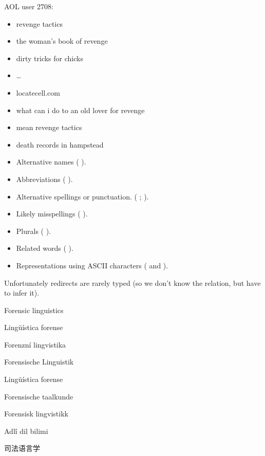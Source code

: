 \documentclass[a4paper,landscape,headrule,footrule,xetex]{foils}
\begin{document}
AOL user 2708:
\begin{itemize}\addtolength{\itemsep}{-1ex}
\item revenge tactics
\item the woman's book of revenge
\item dirty tricks for chicks
\item \ldots
\item locatecell.com
\item what can i do to an old lover for revenge
\item mean revenge tactics
\item death records in hampstead
\end{itemize}


\begin{itemize}\addtolength{\itemsep}{-1ex}
\item  Alternative names ( \into {}).
\item Abbreviations ( \into {}).
\item Alternative spellings or punctuation. ( \into {};  \into {}).
\item Likely misspellings ( \into {}).
\item Plurals ( \into {}).
\item Related words ( \into {}).
\item Representations using ASCII characters ( and  \into  {}). 
 \end{itemize}

Unfortunately redirects are rarely typed (so we don't know the
relation, but have to infer it).
 
\MyLogo{}
\begin{description}\addtolength{\itemsep}{-1ex}
\item[en] Forensic linguistics
\item[ca] Lingüística forense
\item[cs] Forenzní lingvistika
\item[de] Forensische Linguistik
\item[es] Lingüística forense
\item[nl] Forensische taalkunde
\item[no] Forensisk lingvistikk
\item[tr] Adlî dil bilimi
\item[zh] 司法语言学
\end{description}
\end{document}
